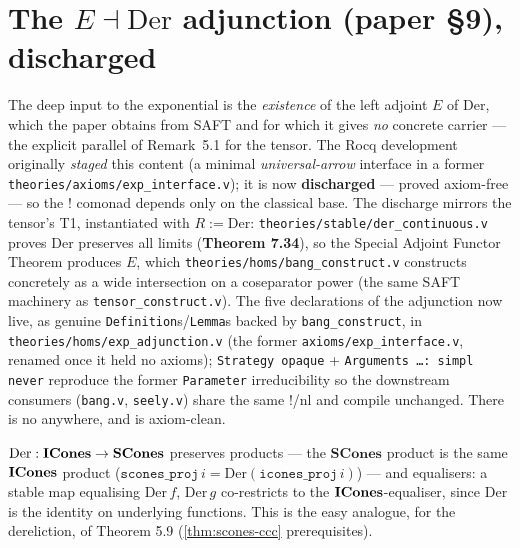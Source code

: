 \section{The \texorpdfstring{$E \dashv \mathrm{Der}$}{E |- Der} adjunction (paper \S9), discharged}%
\label{sec:exp-staging}

The deep input to the exponential is the \emph{existence} of the left
adjoint $E$ of $\mathrm{Der}$, which the paper obtains from SAFT and for
which it gives \emph{no} concrete carrier --- the explicit parallel of
Remark~5.1 for the tensor. The Rocq development originally \emph{staged}
this content (a minimal \emph{universal-arrow} interface in a former
\texttt{theories/axioms/exp\_interface.v}); it is now \textbf{discharged}
--- proved axiom-free --- so the $\mathord{!}$ comonad depends only on
the classical base. The discharge mirrors the tensor's T1, instantiated
with $R := \mathrm{Der}$: \texttt{theories/stable/der\_continuous.v}
proves $\mathrm{Der}$ preserves all limits (\textbf{Theorem 7.34}), so
the Special Adjoint Functor Theorem produces $E$, which
\texttt{theories/homs/bang\_construct.v} constructs concretely as a wide
intersection on a coseparator power (the same SAFT machinery as
\texttt{tensor\_construct.v}). The five declarations of the adjunction
now live, as genuine \texttt{Definition}s/\texttt{Lemma}s backed by
\texttt{bang\_construct}, in \texttt{theories/homs/exp\_adjunction.v}
(the former \texttt{axioms/exp\_interface.v}, renamed once it held no
axioms); \texttt{Strategy opaque} + \texttt{Arguments \ldots : simpl
never} reproduce the former \texttt{Parameter} irreducibility so the
downstream consumers (\texttt{bang.v}, \texttt{seely.v}) share the same
$\mathord{!}$/$\mathrm{nl}$ and compile unchanged. There is no
\Admitted{} anywhere, and  is
axiom-clean.

\begin{theorem}
\label{thm:der-continuous}
\rocqok
{}
$\mathrm{Der} : \mathbf{ICones} \to \mathbf{SCones}$ preserves products --- the
$\mathbf{SCones}$ product is the same $\mathbf{ICones}$ product
($\texttt{scones\_proj}\,i = \mathrm{Der}(\texttt{icones\_proj}\,i)$) ---
and equalisers: a stable map equalising $\mathrm{Der}\,f$, $\mathrm{Der}\,g$
co-restricts to the $\mathbf{ICones}$-equaliser, since $\mathrm{Der}$ is the
identity on underlying functions. This is the easy analogue, for the
dereliction, of Theorem 5.9 (\autoref{thm:scones-ccc} prerequisites).
\end{theorem}

